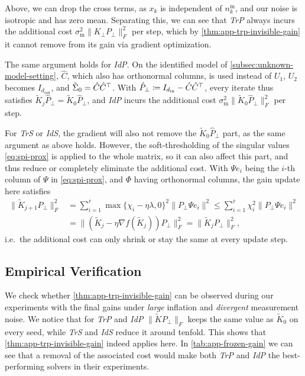 Above, we can drop the cross terms, as $x_k$ is independent of $n^{\mathrm{m}}_k$, and our noise is isotropic and has zero mean.
Separating this, we can see that \emph{TrP} always incurs the additional cost
$\sigma_{\mathrm{m}}^{2} \lVert K_{\perp} P_{\perp} \rVert_F^2$ per step, which by \cref{thm:app-trp-invisible-gain} it
cannot remove from its gain via gradient optimization.

The same argument holds for \emph{IdP}. On the identified model of \cref{subsec:unknown-model-setting}, $\hat{C}$, which
also has orthonormal columns, is used instead of $U_1$, $U_2$ becomes $I_{d_{\mathrm{out}}}$, and $\tilde{\Sigma}_0 = \hat{C} \hat{C}^{\top}$.
With $\hat{P}_{\perp} \coloneqq I_{d_{\mathrm{in}}} - \hat{C} \hat{C}^{\top}$, every iterate thus satisfies
$\tilde{K}_j \hat{P}_{\perp} = \tilde{K}_0 \hat{P}_{\perp}$, and \emph{IdP} incurs the additional cost
$\sigma_{\mathrm{m}}^{2} \lVert \tilde{K}_0 \hat{P}_{\perp} \rVert_F^2$ per step.

For \emph{TrS} or \emph{IdS}, the gradient will also not remove the $\tilde{K}_0 \hat{P}_{\perp}$ part, as the same argument as above holds.
However, the soft-thresholding of the singular values \eqref{eq:spi-prox} is
applied to the whole matrix, so it can also affect this part, and thus reduce or completely eliminate the additional cost.
With $\Psi e_i$ being the $i$-th column of $\Psi$ in \eqref{eq:spi-prox}, and $\Phi$ having orthonormal columns, the gain update here satisfies
\begin{equation}
    \label{eq:app-prox-shrink}
    \begin{aligned}
    \lVert \tilde{K}_{j+1} P_{\perp} \rVert_F^2
    &= \sum_{i=1}^{\bar{r}} \max\{\chi_i - \eta \lambda, 0\}^2 \lVert P_{\perp} \Psi e_i \rVert^2
    \leq \sum_{i=1}^{\bar{r}} \chi_i^2 \lVert P_{\perp} \Psi e_i \rVert^2 \\
    &= \lVert \left( \tilde{K}_j - \eta \nabla f(\tilde{K}_j) \right) P_{\perp} \rVert_F^2
    = \lVert \tilde{K}_j P_{\perp} \rVert_F^2 ,
    \end{aligned}
\end{equation}
i.e.\ the additional cost can only shrink or stay the same at every update step.

\subsection{Empirical Verification}
\label{subsec:app-perf-trp-empirical}

We check whether \cref{thm:app-trp-invisible-gain} can be observed during our experiments with the final
gains under \emph{large} inflation and \emph{divergent} measurement noise. We notice that for \emph{TrP} and \emph{IdP}
$\lVert \tilde{K} P_{\perp} \rVert_F$ keeps the same value as $\tilde{K}_0$ on every seed, while \emph{TrS} and \emph{IdS}
reduce it around tenfold. This shows that \cref{thm:app-trp-invisible-gain} indeed applies here. In \cref{tab:app-frozen-gain} 
we can see that a removal of the associated cost would make both \emph{TrP} and \emph{IdP} the best-performing solvers
in their experiments.

